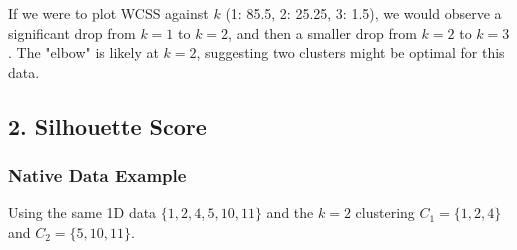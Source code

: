 \documentclass{article}
\begin{document}
If we were to plot WCSS against $k$ (1: 85.5, 2: 25.25, 3: 1.5), we would observe a significant drop from $k=1$ to $k=2$, and then a smaller drop from $k=2$ to $k=3$. The "elbow" is likely at $k=2$, suggesting two clusters might be optimal for this data.

\subsection*{2. Silhouette Score}

\subsubsection*{Native Data Example}

Using the same 1D data $\{1, 2, 4, 5, 10, 11\}$ and the $k=2$ clustering $C_1 = \{1, 2, 4\}$ and $C_2 = \{5, 10, 11\}$.
\end{document}
